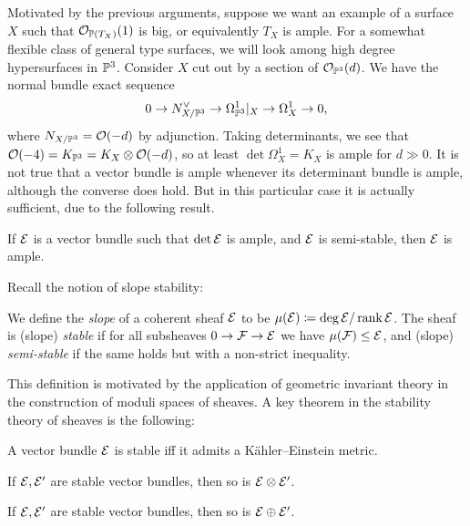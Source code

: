 
Motivated by the previous arguments, suppose we want an example of a surface $X$
such that $\O_{\P(T_X)}(1)$ is big, or equivalently $T_X$ is ample. For a
somewhat flexible class of general type surfaces, we will look among high degree
hypersurfaces in $\P^3$. Consider $X$ cut out by a section of $\O_{\P^3}(d)$. We
have the normal bundle exact sequence
\begin{equation*}
    0 \to N_{X/\P^3}^\vee \to \Omega^1_{\P^3}|_X \to \Omega^1_X \to 0,
\end{equation*}
where $N_{X/\P^3}=\O(-d)$ by adjunction. Taking determinants, we see that
$\O(-4)=K_{\P^3}=K_X\otimes\O(-d)$, so at least $\det\Omega^1_X=K_X$ is ample
for $d\gg0$. It is not true that a vector bundle is ample whenever its
determinant bundle is ample, although the converse does hold. %
But in this particular case it is actually sufficient, due to the following
result.

\begin{proposition}
    If $\calE$ is a vector bundle such that $\det\calE$ is ample, and $\calE$ is
    semi-stable, then $\calE$ is ample.
\end{proposition}



Recall the notion of slope stability:

\begin{definition}
    We define the \emph{slope} of a coherent sheaf $\calE$ to be
    $\mu(\calE)\coloneqq\deg\calE/\rank\calE$. The sheaf is (slope)
    \emph{stable} if for all subsheaves $0\to\calF\to\calE$ we have
    $\mu(\calF)\le\calE$, and (slope) \emph{semi-stable} if the same holds but
    with a non-strict inequality. %
\end{definition}

This definition is motivated by the application of geometric invariant theory in
the construction of moduli spaces of sheaves. A key theorem in the stability
theory of sheaves is the following:

\begin{theorem}[Yau]
    A vector bundle $\calE$ is stable iff it admits a K\"ahler--Einstein metric.
\end{theorem}

\begin{proposition}
    If $\calE,\calE'$ are stable vector bundles, then so is $\calE\otimes\calE'$.
\end{proposition}

\begin{proposition}
    If $\calE,\calE'$ are stable vector bundles, then so is $\calE\oplus\calE'$.
\end{proposition}

